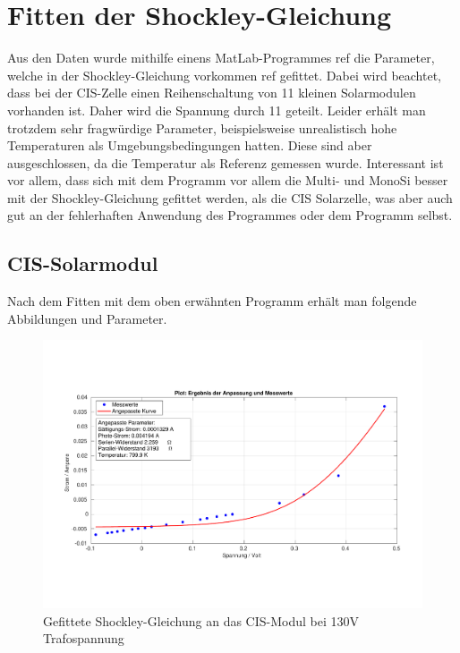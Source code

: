 
\clearpage
\section{Fitten der Shockley-Gleichung}
\label{chapter:fitten}

Aus den Daten wurde mithilfe einens MatLab-Programmes ref die Parameter, welche in der Shockley-Gleichung vorkommen ref gefittet. Dabei wird beachtet, 
dass bei der CIS-Zelle einen Reihenschaltung von 11 kleinen Solarmodulen vorhanden ist. Daher wird die Spannung durch 11 geteilt. Leider erhält man 
trotzdem sehr fragwürdige Parameter, beispielsweise unrealistisch hohe Temperaturen als Umgebungsbedingungen hatten. Diese sind aber ausgeschlossen, 
da die Temperatur als Referenz gemessen wurde.
Interessant ist vor allem, dass sich mit dem Programm vor allem die Multi- und MonoSi besser mit der Shockley-Gleichung gefittet werden, als 
die CIS Solarzelle, was aber auch gut an der fehlerhaften Anwendung des Programmes oder dem Programm selbst.

\subsection{CIS-Solarmodul}

Nach dem Fitten mit dem oben erwähnten Programm erhält man folgende Abbildungen und Parameter.

\begin{figure}[ht]
    \centering
    \includegraphics[width = \linewidth]{Bilder/CIS130Plot.pdf}
    \caption{Gefittete Shockley-Gleichung an das CIS-Modul bei 130V Trafospannung}
    
\end{figure}


